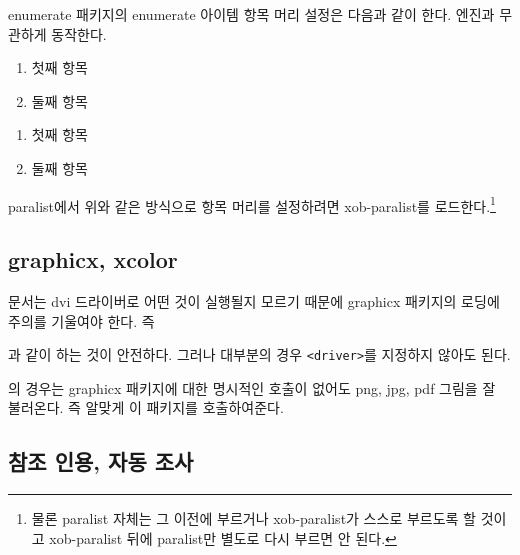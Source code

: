 \documentclass[
	12pt,
	a4paper,
	kosection,
	footnote,
	nobookmarks,
	microtype,
]{oblivoir}
\newcommand\obclass{ob\-liv\-oir\oblivoirallowbreak}
\begin{document}
enumerate 패키지의 enumerate 아이템 항목 머리 설정은
다음과 같이 한다. 엔진과 무관하게 동작한다.
\begin{boxedverbatim}
\begin{enumerate}[(㉠)] \tightlist
\item 첫째 항목
\item 둘째 항목
\end{enumerate}
\end{boxedverbatim}
\begin{enumerate}[(㉠)] \tightlist
\item 첫째 항목
\item 둘째 항목
\end{enumerate}
paralist에서 위와 같은 방식으로 항목 머리를 설정하려면 
xob-paralist를 로드한다.\footnote{%
	물론 paralist 자체는 그 이전에 부르거나
	xob-paralist가 스스로 부르도록 할 것이고 xob-paralist 뒤에
	paralist만 별도로 다시 부르면 안 된다.
}

\subsection{graphicx, xcolor}

 문서는 dvi 드라이버로 어떤 것이 실행될지 모르기 때문에 graphicx 패키지의
로딩에 주의를 기울여야 한다. 즉
\begin{boxedverbatim}
\usepackage[<driver>]{graphicx}
\end{boxedverbatim}
과 같이 하는 것이 안전하다. 그러나 대부분의 경우 \verb|<driver>|를 지정하지 않아도 된다.

 \LuaTeX 의 경우는 graphicx 패키지에 대한 명시적인 호출이 없어도 
png, jpg, pdf 그림을 잘 불러온다. 즉  알맞게 이 패키지를 호출하여준다.

\subsection{참조 인용, 자동 조사}
\end{document}
